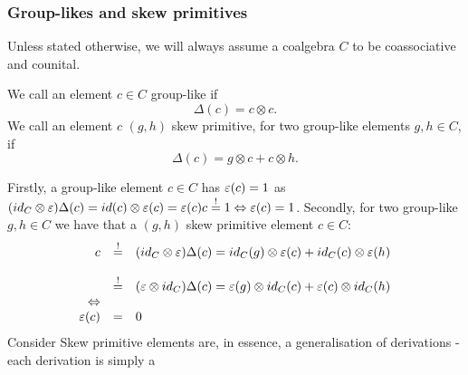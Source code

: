 \subsubsection{Group-likes and skew primitives}
Unless stated otherwise, we will always assume a coalgebra $C$ to be coassociative and counital.
\begin{defi}
We call an element $c \in C$ group-like if
$$\Delta(c) = c \otimes c.$$
We call an element $c$ $(g,h)$ skew primitive, for two group-like elements $g, h \in C$, if
$$\Delta(c) = g \otimes c + c \otimes h.$$
\end{defi}
Firstly, a group-like element $c \in C$ has $\eps(c) = 1$ as $(id_C \otimes \eps)\Delta(c) = id(c) \otimes \eps(c) = \eps(c) c \stackrel{!}{=} 1 \Leftrightarrow \eps(c) = 1$. Secondly, for two group-like $g, h \in C$ we have that a $(g,h)$ skew primitive element $c \in C$:
$$\bao{rcl}
c &\stackrel{!}{=}& (id_C \otimes \eps)\Delta(c) = id_C(g) \otimes \eps(c) + id_C(c) \otimes \eps(h)\\
&&\\
&\stackrel{!}{=}& (\eps \otimes id_C)\Delta(c) = \eps(g) \otimes id_C(c) + \eps(c) \otimes id_C(h)\\
\Leftrightarrow\\
\eps(c) &=& 0\\
\ea$$
\bmk Consider Skew primitive elements are, in essence, a generalisation of derivations - each derivation is simply a 